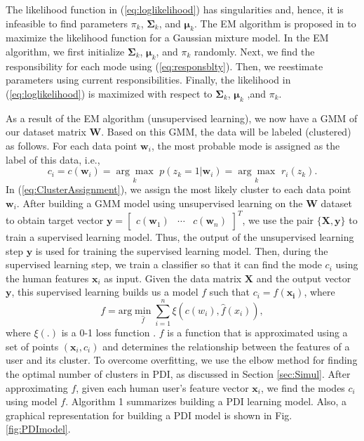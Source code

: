 \documentclass[journal,draftclsnofoot,onecolumn,12pt]{IEEEtran}%
\newcommand{\mub}{\boldsymbol{\mu}}
\newcommand{\Sigmab}{\boldsymbol{\Sigma}}
\newcommand{\xb}{\boldsymbol{x}}
\newcommand{\Xb}{\boldsymbol{X}}
\newcommand{\yb}{\boldsymbol{y}}
\newcommand{\wb}{\boldsymbol{w}}
\begin{document}
	The likelihood function in (\ref{eq:loglikelihood}) has singularities and, hence, it is infeasible to find  parameters $\pi_k$, $\Sigmab_k$, and $\mub_k$. The EM algorithm is proposed in \cite{EM98main} to maximize the likelihood function for a Gaussian mixture model. { In the EM algorithm, we first initialize $\Sigmab_k$, $\boldsymbol{\mu}_k$, and $\pi_k$ randomly. Next, we find the responsibility for each mode using (\ref{eq:responsblty}). Then, we reestimate parameters using current responsibilities. Finally,  the likelihood in (\ref{eq:loglikelihood}) is maximized with respect to  $\Sigmab_k$, $\boldsymbol{\mu}_k$ ,and $\pi_k$.}
	
    {As a result of the EM algorithm (unsupervised learning), we now have a GMM of our dataset matrix $\boldsymbol{W}$. 
	Based on this GMM, the data will be labeled (clustered) as follows. 
	For each data point $\wb_i$, the most probable mode is assigned as the label of this data, i.e., \begin{equation}\label{eq:ClusterAssignment}
    c_i=c(\wb_i)=\underset{k}{\arg \max}\,\, p(z_k=1|\wb_i)=\underset{k}{\arg \max}\,\, r_i(z_k).
    \end{equation}  
	In (\ref{eq:ClusterAssignment}), we assign the most likely cluster to each data point $\wb_i$.}
	{After building a GMM model using unsupervised learning on the $\boldsymbol{W}$ dataset to obtain target vector $\yb=\begin{bmatrix}
	c(\wb_1) & \cdots &c(\wb_n)
	\end{bmatrix}^T$, we use the pair $\{\Xb,\yb\}$ to train a supervised learning model.
	Thus, the output of the unsupervised learning step $\yb$ is used for training the supervised learning model.
	Then, during the supervised learning step, we train a classifier so that it can find the mode $c_i$ using the human features $\xb_i$ as input.
    Given the data matrix $\Xb$ and the output vector $\yb$, this supervised learning builds us a model $f$ such that $c_i=f(\boldsymbol{x_i})$, where
    \begin{equation}\label{eq:supervisedF}
    f=\textrm{arg}\min_{\hat f} \sum_{i=1}^n \xi\left(c(w_i),\hat f (x_i)\right),
    \end{equation}
    where $\xi(.)$ is a 0-1 loss function \cite[Equation 7.5]{friedman2001elements}. $f$ is a function that is approximated using a set of points $(\xb_i,c_i)$ and determines the relationship between the features of a user and its cluster.} To overcome overfitting, we use the elbow method for finding the optimal number of clusters in PDI, as discussed in Section \ref{sec:Simul}.
	After approximating $f$, given each human user's feature vector $\xb_i$, we find the modes $c_i$ using model $f$.
	{Algorithm 1 summarizes building a PDI learning model.} {Also, a graphical representation for building a PDI model is shown in Fig. \ref{fig:PDImodel}}.
\end{document}
